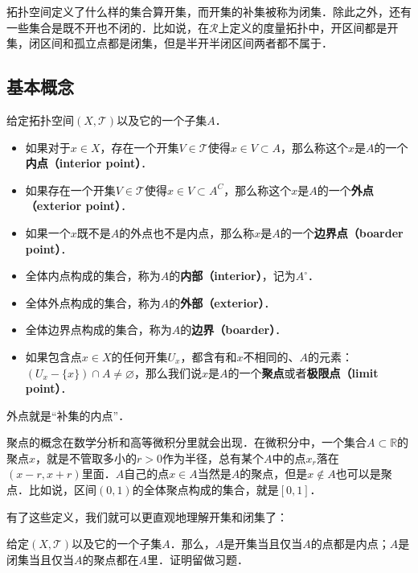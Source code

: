 
拓扑空间定义了什么样的集合算开集，而开集的补集被称为闭集．除此之外，还有一些集合是既不开也不闭的．比如说，在$\mathcal{R}$上定义的度量拓扑中，开区间都是开集，闭区间和孤立点都是闭集，但是半开半闭区间两者都不属于．

\subsection{基本概念}
\begin{definition}{}
给定拓扑空间$(X, \mathcal{T})$以及它的一个子集$A$．
\begin{itemize}
\item 如果对于$x\in X$，存在一个开集$V\in \mathcal{T}$使得$x\in V\subset A$，那么称这个$x$是$A$的一个\textbf{内点（interior point）}．
\item 如果存在一个开集$V\in \mathcal{T}$使得$x\in V\subset A^C$，那么称这个$x$是$A$的一个\textbf{外点（exterior point）}．
\item 如果一个$x$既不是$A$的外点也不是内点，那么称$x$是$A$的一个\textbf{边界点（boarder point）}．

\item 全体内点构成的集合，称为$A$的\textbf{内部（interior）}，记为$A^\circ$．
\item 全体外点构成的集合，称为$A$的\textbf{外部（exterior）}．
\item 全体边界点构成的集合，称为$A$的\textbf{边界（boarder）}．
\item 如果包含点$x\in X$的任何开集$U_x$，都含有和$x$不相同的、$A$的元素：$(U_x-\{x\})\cap A\not=\varnothing$，那么我们说$x$是$A$的一个\textbf{聚点}或者\textbf{极限点（limit point）}．
\end{itemize}
\end{definition}

外点就是“补集的内点”．

聚点的概念在数学分析和高等微积分里就会出现．在微积分中，一个集合$A\subset\mathbb{R}$的聚点$x$，就是不管取多小的$r>0$作为半径，总有某个$A$中的点$x_r$落在$(x-r, x+r)$里面．$A$自己的点$x\in A$当然是$A$的聚点，但是$x\not\in A$也可以是聚点．比如说，区间$(0,1)$的全体聚点构成的集合，就是$[0,1]$．

有了这些定义，我们就可以更直观地理解开集和闭集了：

\begin{exercise}{}\label{Topo0_exe1}
给定$(X, \mathcal{T})$以及它的一个子集$A$．那么，$A$是开集当且仅当$A$的点都是内点；$A$是闭集当且仅当$A$的聚点都在$A$里．证明留做习题．
\end{exercise}

